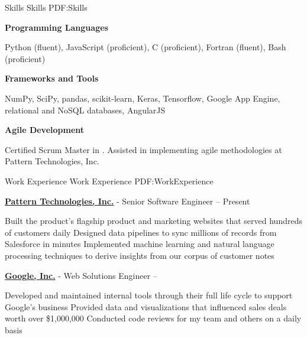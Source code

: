 \documentclass[letterpaper,MMMyyyy,nonstopmode]{simpleresumecv}
\begin{document}
\begin{Body}


\Section
{Skills}
{Skills}
{PDF:Skills}

\Entry
\textbf{Programming Languages}
\begin{Detail}
\Item Python (fluent), JavaScript (proficient), C (proficient), Fortran (fluent), Bash (proficient)
\end{Detail}

\BigGap
\Entry
\textbf{Frameworks and Tools}
\begin{Detail}
\Item NumPy, SciPy, pandas, scikit-learn, Keras, Tensorflow, Google App Engine, relational and NoSQL databases, AngularJS
\end{Detail}

\BigGap
\Entry
\textbf{Agile Development}
\begin{Detail}
\Item Certified Scrum Master in .  Assisted in implementing agile methodologies at Pattern Technologies, Inc.
\end{Detail}


\Section
{Work Experience}
{Work Experience}
{PDF:WorkExperience}

\Entry
\href {https://getpattern.com}{\textbf{Pattern Technologies, Inc.}}
-
Senior Software Engineer
\hfill
{} -- Present

\Gap
\begin{Detail}
\BulletItem
Built the product's flagship product and
marketing websites that served hundreds of customers daily
\BulletItem
Designed data pipelines to sync millions of records from Salesforce in minutes
\BulletItem
Implemented machine learning and natural language processing techniques to derive insights from our corpus of customer notes
\end{Detail}


\BigGap
\Entry
\href {https://google.com}{\textbf{Google, Inc.}}
-
Web Solutions Engineer
\hfill
{} -- 

\Gap
\begin{Detail}
\BulletItem
Developed and maintained internal tools through their full life cycle to support Google's business
\BulletItem
Provided data and visualizations that influenced sales deals worth over \$1,000,000
\BulletItem
Conducted code reviews for my team and others on a daily basis
\end{Detail}



\end{Body}
\end{document}

